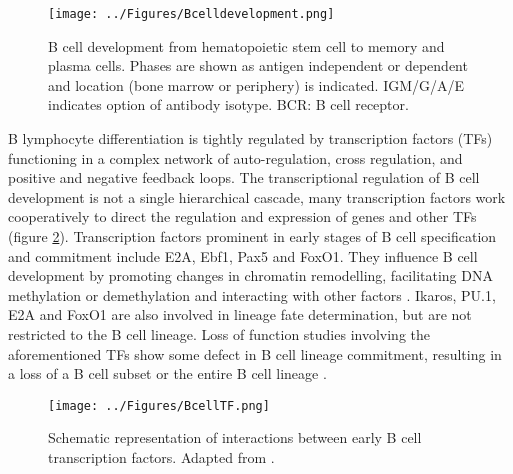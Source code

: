 \documentclass[12pt]{article}
\begin{document}
			
			\begin{figure}[tb]
				\centering
				\texttt{[image: ../Figures/Bcelldevelopment.png]}
				\caption{B cell development from hematopoietic stem cell to memory and plasma cells. Phases are shown as antigen independent or dependent and location (bone marrow or periphery) is indicated. IGM/G/A/E indicates option of antibody isotype. BCR: B cell receptor.}
				\label{fig:BCellDevelopment}
			\end{figure}
			
			B lymphocyte differentiation is tightly regulated by transcription factors (TFs) functioning in a complex network of auto-regulation, cross regulation, and positive and negative feedback loops.
			The transcriptional regulation of B cell development is not a single hierarchical cascade, many transcription factors work cooperatively to direct the regulation and expression of genes and other TFs (figure \ref{fig:TFBcell}). 
			Transcription factors prominent in early stages of B cell specification and commitment include E2A, Ebf1, Pax5 and FoxO1. 
			They influence B cell development by promoting changes in chromatin remodelling, facilitating DNA methylation or demethylation and interacting with other factors \citep{Gao09,Maier04,Walter08,Decker09,Lin10,McManus11,Treiber10,Zandi00}. 
			Ikaros, PU.1, E2A and FoxO1 are also involved in lineage fate determination, but are not restricted to the B cell lineage.
			Loss of function studies involving the aforementioned TFs show some defect in B cell lineage commitment, resulting in a loss of a B cell subset or the entire B cell lineage \citep{Choukrallah14}.

			
			\begin{figure}
				\centering
				\texttt{[image: ../Figures/BcellTF.png]}
				\caption{Schematic representation of interactions between early B cell transcription factors. Adapted from \citet{Choukrallah14}.}
				\label{fig:TFBcell}
			\end{figure}
			
			
\end{document}
